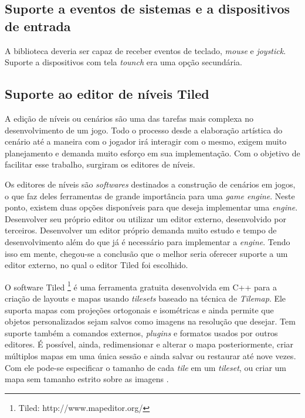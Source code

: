 \subsection{Suporte a eventos de sistemas e a dispositivos de entrada}
%
A biblioteca deveria ser capaz de receber eventos de teclado, \textit{mouse} e \textit{joystick}. Suporte a dispositivos com tela \textit{tounch} era uma opção secundária.
%
\subsection{Suporte ao editor de níveis Tiled}
%
A edição de níveis ou cenários são uma das tarefas mais complexa no desenvolvimento de um jogo. Todo o processo desde a elaboração artística do cenário até a maneira com o jogador irá interagir com o mesmo, exigem muito planejamento e demanda muito esforço em sua implementação. Com o objetivo de facilitar esse trabalho, surgiram os editores de níveis. 
\par
Os editores de níveis são \textit{softwares} destinados a construção de cenários em jogos, o que faz deles ferramentas de grande importância para uma \textit{game engine}. Neste ponto, existem duas opções disponíveis para que deseja implementar uma \textit{engine}. Desenvolver seu próprio editor ou utilizar um editor externo, desenvolvido por terceiros. Desenvolver um editor próprio demanda muito estudo e tempo de desenvolvimento além do que já é necessário para implementar a \textit{engine}. Tendo isso em mente, chegou-se a conclusão que o melhor seria oferecer suporte a um editor externo, no qual o editor Tiled foi escolhido. 
\par
O software Tiled \footnote{Tiled: http://www.mapeditor.org/} é uma ferramenta gratuita desenvolvida em C++ para a criação de layouts e mapas usando \textit{tilesets} baseado na técnica de \textit{Tilemap}. Ele suporta mapas com projeções ortogonais e isométricas e ainda permite que 
objetos personalizados sejam salvos como imagens na resolução que desejar. Tem suporte também a comandos externos, 
\textit{plugins} e formatos usados por outros editores. É possível, ainda, redimensionar e alterar o mapa posteriormente, criar múltiplos mapas em uma única sessão e ainda salvar ou restaurar até nove vezes. Com ele pode-se especificar o tamanho de cada \textit{tile} em um \textit{tileset}, ou criar um mapa sem tamanho estrito sobre as imagens \cite{TiledTutorial}.
%
